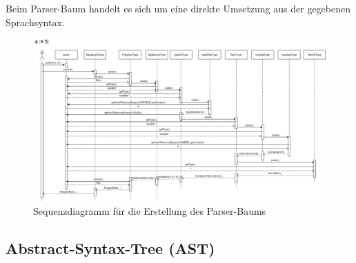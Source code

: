 Beim Parser-Baum handelt es sich um eine direkte Umsetzung aus der gegebenen Sprachsyntax. 
\begin{figure}[tbh]
	\hspace{-0.1\linewidth}
	\includegraphics[width=1.2\linewidth]{images/sequenzdiagramm}
	\caption[Sequenzdiagramm Parser]{Sequenzdiagramm für die Erstellung des Parser-Baums}
	\label{fig:sequenzdiagramm}
\end{figure}


\subsection{Abstract-Syntax-Tree (AST)}\label{subsection:ast}

